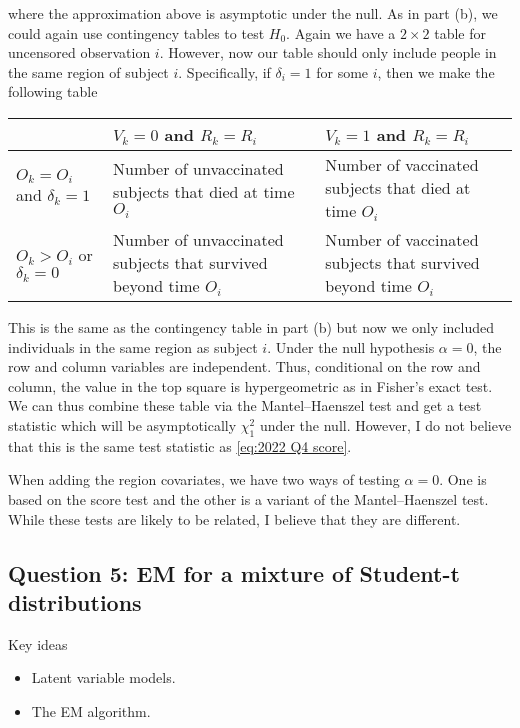 \begin{enumerate}[label=(\alph*)]
    where the approximation above is asymptotic under the null.  As in part (b), we could again use contingency tables to test $H_0$. Again we have a $2 \times 2$ table for uncensored observation $i$. However, now our table should only include people in the same region of subject $i$. Specifically, if $\delta_i=1$ for some $i$, then we make the following table
    \begin{table}[h]
        \begin{center}
        \begin{tabular}{|p{2.5cm}|p{5cm}|p{5cm}|}
            \hline
         &$V_k=0$ and $R_k=R_i$ & $V_k=1$ and $R_k=R_i$ \\
         \hline 
        $O_k=O_i$ and $\delta_k=1$ & Number of unvaccinated subjects that died at time $O_i$ & Number of vaccinated subjects that died at time $O_i$\\ 
        \hline 
        $O_k > O_i$ or $\delta_k = 0$& Number of unvaccinated subjects that survived beyond time $O_i$ & Number of vaccinated subjects that survived beyond time $O_i$ \\
        \hline 
        \end{tabular}
    \end{center}
    \end{table}
    This is the same as the contingency table in part (b) but now we only included individuals in the same region as subject $i$. Under the null hypothesis $\alpha = 0$, the row and column variables are independent. Thus, conditional on the row and column, the value in the top square is hypergeometric as in Fisher's exact test. We can thus combine these table via the Mantel--Haenszel test and get a test statistic which will be asymptotically $\chi^2_1$ under the null. However, I do not believe that this is the same test statistic as \eqref{eq:2022 Q4 score}.
    
    When adding the region covariates, we have two ways of testing $\alpha = 0$. One is based on the score test and the other is a variant of the Mantel--Haenszel test. While these tests are likely to be related, I believe that they are different. 
\end{enumerate}

\subsection*{Question 5: EM for a mixture of Student-t distributions}

Key ideas
\begin{itemize}
    \item Latent variable models.
    \item The EM algorithm.
\end{itemize}

